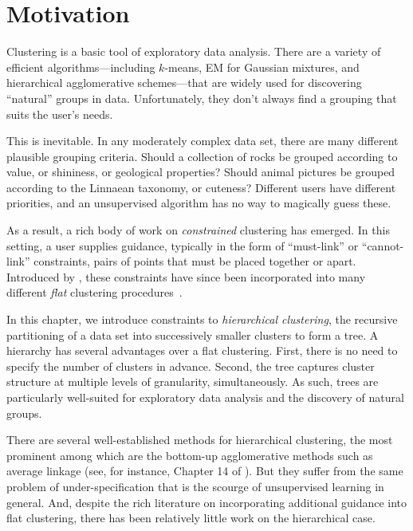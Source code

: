 
\section{Motivation}
Clustering is a basic tool of exploratory data analysis. There are a variety of efficient algorithms---including $k$-means, EM for Gaussian mixtures, and hierarchical agglomerative schemes---that are widely used for discovering ``natural'' groups in data. Unfortunately, they don't always find a grouping that suits the user's needs.

This is inevitable. In any moderately complex data set, there are many different plausible grouping criteria. Should a collection of rocks be grouped according to value, or shininess, or geological properties? Should animal pictures be grouped according to the Linnaean taxonomy, or cuteness? Different users have different priorities, and an unsupervised algorithm has no way to magically guess these.

As a result, a rich body of work on {\it constrained} clustering has emerged.
In this setting, a user supplies guidance, typically in the form of ``must-link'' or ``cannot-link'' constraints, pairs of points that must be placed together or apart. Introduced by \citet{Wagstaff2001}, these constraints have since been incorporated into many different {\it flat} clustering procedures~\citep{Wagstaff2000,Bansal2004,Basu2004,Kulis2009,Biswas2014}.

In this chapter, we introduce constraints to {\it hierarchical clustering}, the recursive partitioning of a data set into successively smaller clusters to form a tree. A hierarchy has several advantages over a flat clustering. First, there is no need to specify the number of clusters in advance. Second, the tree captures cluster structure at multiple levels of granularity, simultaneously. As such, trees are particularly well-suited for exploratory data analysis and the discovery of natural groups.

There are several well-established methods for hierarchical clustering, the most prominent among which are the bottom-up agglomerative methods such as average linkage (see, for instance, Chapter 14 of \citet{Hastie2009}). But they suffer from the same problem of under-specification that is the scourge of unsupervised learning in general. And, despite the rich literature on incorporating additional guidance into flat clustering, there has been relatively little work on the hierarchical case.

